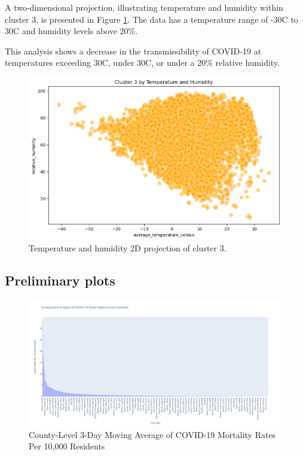 \documentclass[sigconf,screen,nonacm]{acmart}
\begin{document}
A two-dimensional projection, illustrating temperature and humidity within cluster 3, is presented in Figure \ref{fig:2D-cluster}. The data has a temperature range of -30\textdegree{}C to 30\textdegree{}C and humidity levels above 20\%. 

This analysis shows a decrease in the transmissibility of COVID-19 at temperatures exceeding 30\textdegree{}C, under 30\textdegree{}C, or under a 20\% relative humidity.



\begin{figure}[H]
  \centering
  \includegraphics[width=\linewidth]{Figures/Cluster3-2D.PNG}
  \caption{Temperature and humidity 2D projection of cluster 3.}
  \label{fig:2D-cluster}
\end{figure}

\subsection{Preliminary plots}
\begin{figure}[H]
  \centering
  \includegraphics[width=\linewidth]{Figures/3daymovingaverage.png}
  \caption{County-Level 3-Day Moving Average of COVID-19 Mortality Rates Per 10,000 Residents}
  \label{fig:3day_moving_average_mortality}
\end{figure}
\end{document}
